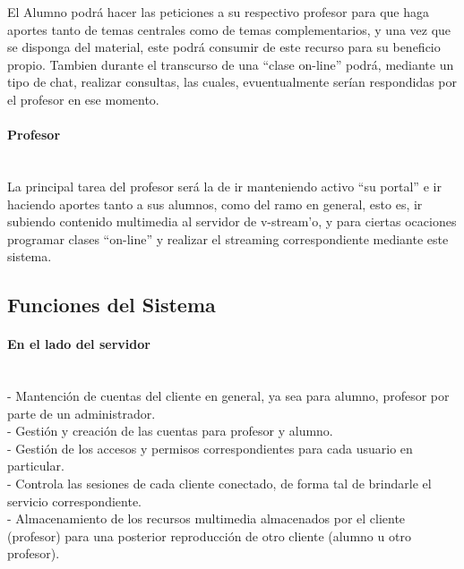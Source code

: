 \documentclass[12pt]{article}
\begin{document}
El Alumno podrá hacer las peticiones a su respectivo profesor para que haga aportes tanto de temas 
centrales como de temas complementarios, y una vez que se disponga del material, este podrá consumir
de este recurso para su beneficio propio. Tambien durante el transcurso de una ``clase on-line'' podrá,
mediante un tipo de chat, realizar consultas, las cuales, evuentualmente serían respondidas por el profesor en ese momento.\\

\paragraph{Profesor\\\\}

La principal tarea del profesor será la de ir manteniendo activo ``su portal'' e ir haciendo aportes
tanto a sus alumnos, como del ramo en general, esto es, ir subiendo contenido multimedia al servidor de 
v-stream'o, y para ciertas ocaciones programar clases ``on-line'' y realizar el streaming correspondiente
mediante este sistema.\\

\subsection{Funciones del Sistema}

\paragraph{En el lado del servidor\\\\}

-	Mantención de cuentas del cliente en general, ya sea para alumno, profesor por parte de un administrador.\\

-	Gestión y creación de las cuentas para profesor y alumno.\\

-	Gestión de los accesos y permisos correspondientes para cada usuario en particular.\\

-	Controla las sesiones de cada cliente conectado, de forma tal de brindarle el servicio correspondiente.\\

-	Almacenamiento de los recursos multimedia almacenados por el cliente (profesor) para una posterior
reproducción de otro cliente (alumno u otro profesor).\\
\end{document}
